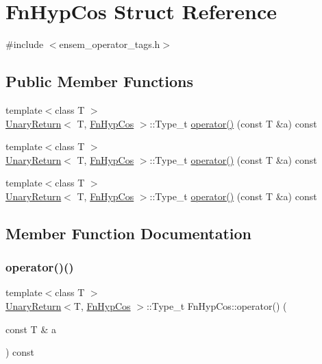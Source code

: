 \hypertarget{structFnHypCos}{}\section{Fn\+Hyp\+Cos Struct Reference}
\label{structFnHypCos}


{\ttfamily \#include $<$ensem\+\_\+operator\+\_\+tags.\+h$>$}

\subsection*{Public Member Functions}
\begin{DoxyCompactItemize}
\item 
{\footnotesize template$<$class T $>$ }\\\mbox{\hyperlink{structUnaryReturn}{Unary\+Return}}$<$ T, \mbox{\hyperlink{structFnHypCos}{Fn\+Hyp\+Cos}} $>$\+::Type\+\_\+t \mbox{\hyperlink{structFnHypCos_ab6e05ff6650f0719ca08b86905fba763}{operator()}} (const T \&a) const
\item 
{\footnotesize template$<$class T $>$ }\\\mbox{\hyperlink{structUnaryReturn}{Unary\+Return}}$<$ T, \mbox{\hyperlink{structFnHypCos}{Fn\+Hyp\+Cos}} $>$\+::Type\+\_\+t \mbox{\hyperlink{structFnHypCos_ab6e05ff6650f0719ca08b86905fba763}{operator()}} (const T \&a) const
\item 
{\footnotesize template$<$class T $>$ }\\\mbox{\hyperlink{structUnaryReturn}{Unary\+Return}}$<$ T, \mbox{\hyperlink{structFnHypCos}{Fn\+Hyp\+Cos}} $>$\+::Type\+\_\+t \mbox{\hyperlink{structFnHypCos_ab6e05ff6650f0719ca08b86905fba763}{operator()}} (const T \&a) const
\end{DoxyCompactItemize}


\subsection{Member Function Documentation}
\mbox{\label{structFnHypCos_ab6e05ff6650f0719ca08b86905fba763}} 
\subsubsection{\texorpdfstring{operator()()}{operator()()}\hspace{0.1cm}{\footnotesize\ttfamily [1/3]}}
{\footnotesize\ttfamily template$<$class T $>$ \\
\mbox{\hyperlink{structUnaryReturn}{Unary\+Return}}$<$T, \mbox{\hyperlink{structFnHypCos}{Fn\+Hyp\+Cos}} $>$\+::Type\+\_\+t Fn\+Hyp\+Cos\+::operator() (\begin{DoxyParamCaption}\item[{const T \&}]{a }\end{DoxyParamCaption}) const\hspace{0.3cm}{\ttfamily [inline]}}

